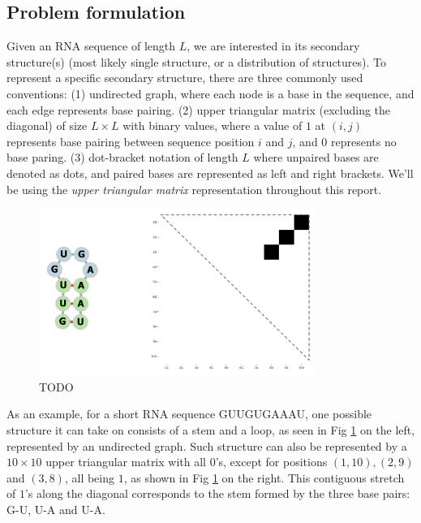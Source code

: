 \documentclass[12pt]{article}
\begin{document}
\subsection{Problem formulation}

Given an RNA sequence of length $L$, we are interested in its secondary structure(s) (most likely single structure, or a distribution of structures).
To represent a specific secondary structure, there are three commonly used conventions:
(1) undirected graph, where each node is a base in the sequence, and each edge represents base pairing.
(2) upper triangular matrix (excluding the diagonal)
of size $L \times L$ with binary values, where a value of $1$ at $(i, j)$ represents
base pairing between sequence position $i$ and $j$, and $0$ represents no base paring.
(3) dot-bracket notation of length $L$ where unpaired bases are denoted as dots,
    and paired bases are represented as left and right brackets.
We'll be using the \textit{upper triangular matrix} representation throughout this report.


\begin{figure}[h]
    \centering
    \includegraphics[width=0.8\textwidth]{plot/rna_ss_binary_mat.png}
    \caption{TODO}
    \label{fig:rna_ss_binary_mat}
    \centering
\end{figure}

As an example, for a short RNA sequence GUUGUGAAAU, one possible structure it can take on
consists of a stem and a loop, as seen in Fig \ref{fig:rna_ss_binary_mat} on the left, represented by an undirected graph.
Such structure can also be represented by a $10 \times 10$ upper triangular matrix with all $0$'s,
except for positions
$(1, 10), (2, 9)$ and $(3, 8)$,
all being $1$, as shown in Fig \ref{fig:rna_ss_binary_mat} on the right.
This contiguous stretch of $1$'s along the diagonal corresponds to the stem formed by the three base pairs: G-U, U-A and U-A.
\end{document}
